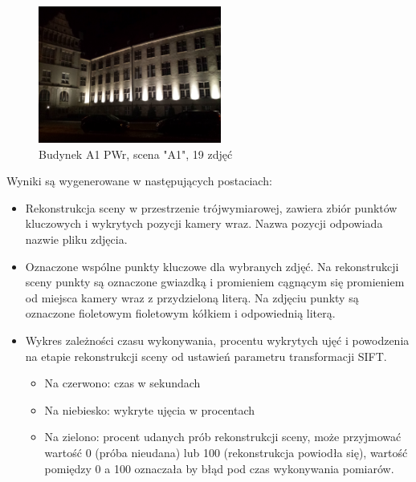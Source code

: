 \begin{figure}[h]
   \centering
   \includegraphics[width=6cm]{img/A1.jpg}
   \caption{Budynek A1 PWr, scena "A1", 19 zdjęć}
   \label {fig:scene_A1}
\end{figure}

Wyniki są wygenerowane w następujących postaciach:
\begin{itemize}
   \item Rekonstrukcja sceny w przestrzenie trójwymiarowej, zawiera zbiór punktów kluczowych i wykrytych pozycji kamery wraz. Nazwa pozycji odpowiada nazwie pliku zdjęcia.
   \item Oznaczone wspólne punkty kluczowe dla wybranych zdjęć. Na rekonstrukcji sceny punkty są oznaczone gwiazdką i promieniem cągnącym się promieniem od miejsca kamery wraz z przydzieloną literą. Na zdjęciu punkty są oznaczone fioletowym fioletowym kółkiem i odpowiednią literą.
   \item Wykres zależności czasu wykonywania, procentu wykrytych ujęć i powodzenia na etapie rekonstrukcji sceny od ustawień parametru transformacji SIFT.
   \begin{itemize}
      \item  Na czerwono: czas w sekundach
      \item  Na niebiesko: wykryte ujęcia w procentach
      \item  Na zielono: procent udanych prób rekonstrukcji sceny, może przyjmować wartość 0 (próba nieudana) lub 100 (rekonstrukcja powiodła się), wartość pomiędzy 0 a 100 oznaczała by błąd pod czas wykonywania pomiarów.
   \end{itemize}
\end{itemize}


